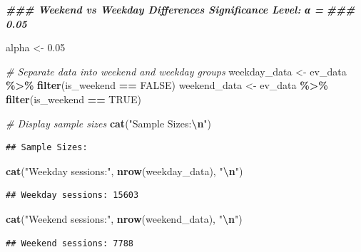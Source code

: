 \documentclass[
  12pt,
]{article}
\newenvironment{Shaded}{\begin{snugshade}}{\end{snugshade}}
\newcommand{\CommentTok}[1]{\textcolor[rgb]{0.56,0.35,0.01}{\textit{#1}}}
\newcommand{\ConstantTok}[1]{\textcolor[rgb]{0.56,0.35,0.01}{#1}}
\newcommand{\DocumentationTok}[1]{\textcolor[rgb]{0.56,0.35,0.01}{\textbf{\textit{#1}}}}
\newcommand{\FloatTok}[1]{\textcolor[rgb]{0.00,0.00,0.81}{#1}}
\newcommand{\FunctionTok}[1]{\textcolor[rgb]{0.13,0.29,0.53}{\textbf{#1}}}
\newcommand{\NormalTok}[1]{#1}
\newcommand{\OtherTok}[1]{\textcolor[rgb]{0.56,0.35,0.01}{#1}}
\newcommand{\SpecialCharTok}[1]{\textcolor[rgb]{0.81,0.36,0.00}{\textbf{#1}}}
\newcommand{\StringTok}[1]{\textcolor[rgb]{0.31,0.60,0.02}{#1}}
\begin{document}
\begin{Shaded}
\begin{Highlighting}[]
\DocumentationTok{\#\#\# Weekend vs Weekday Differences Significance Level: α =}
\DocumentationTok{\#\#\# 0.05}

\NormalTok{alpha }\OtherTok{\textless{}{-}} \FloatTok{0.05}

\CommentTok{\# Separate data into weekend and weekday groups}
\NormalTok{weekday\_data }\OtherTok{\textless{}{-}}\NormalTok{ ev\_data }\SpecialCharTok{\%\textgreater{}\%}
    \FunctionTok{filter}\NormalTok{(is\_weekend }\SpecialCharTok{==} \ConstantTok{FALSE}\NormalTok{)}
\NormalTok{weekend\_data }\OtherTok{\textless{}{-}}\NormalTok{ ev\_data }\SpecialCharTok{\%\textgreater{}\%}
    \FunctionTok{filter}\NormalTok{(is\_weekend }\SpecialCharTok{==} \ConstantTok{TRUE}\NormalTok{)}

\CommentTok{\# Display sample sizes}
\FunctionTok{cat}\NormalTok{(}\StringTok{"Sample Sizes:}\SpecialCharTok{\textbackslash{}n}\StringTok{"}\NormalTok{)}
\end{Highlighting}
\end{Shaded}

\begin{verbatim}
## Sample Sizes:
\end{verbatim}

\begin{Shaded}
\begin{Highlighting}[]
\FunctionTok{cat}\NormalTok{(}\StringTok{"Weekday sessions:"}\NormalTok{, }\FunctionTok{nrow}\NormalTok{(weekday\_data), }\StringTok{"}\SpecialCharTok{\textbackslash{}n}\StringTok{"}\NormalTok{)}
\end{Highlighting}
\end{Shaded}

\begin{verbatim}
## Weekday sessions: 15603
\end{verbatim}

\begin{Shaded}
\begin{Highlighting}[]
\FunctionTok{cat}\NormalTok{(}\StringTok{"Weekend sessions:"}\NormalTok{, }\FunctionTok{nrow}\NormalTok{(weekend\_data), }\StringTok{"}\SpecialCharTok{\textbackslash{}n}\StringTok{"}\NormalTok{)}
\end{Highlighting}
\end{Shaded}

\begin{verbatim}
## Weekend sessions: 7788
\end{verbatim}
\end{document}
